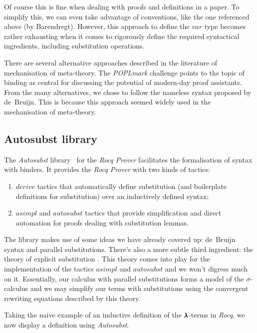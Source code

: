 Of course this is fine when dealing with proofs and definitions in a paper.
To simplify this, we can even take advantage of conventions, like the one referenced above (by Barendregt).
However, this approach to define the \lst$var$ type becomes rather exhausting when it comes to rigorously define the required syntactical ingredients, including substitution operations.

There are several alternative approaches described in the literature of mechanisation of meta-theory. 
The \textit{POPLmark} challenge \cite{POPLmark} points to the topic of binding as central for discussing the potential of modern-day proof assistants.
From the many alternatives, we chose to follow the nameless syntax proposed by de~Bruijn.
This is because this approach seemed widely used in the mechanisation of meta-theory.

\subsection{Autosubst library}


The \textit{Autosubst} library~\cite{AutosubstSchafer,AutosubstManual} for the \textit{Rocq Prover} facilitates the formalisation of syntax with binders.
It provides the \textit{Rocq Prover} with two kinds of tactics:
\begin{enumerate}
  \item \lst$derive$ tactics that automatically define substitution (and boilerplate definitions for substitution) over an inductively defined syntax;
  \item \lst$asimpl$ and \lst$autosubst$ tactics that provide simplification and direct automation for proofs dealing with substitution lemmas.
\end{enumerate}

The library makes use of some ideas we have already covered up: de~Bruijn syntax and parallel substitutions.
There's also a more subtle third ingredient: the theory of explicit substitution \cite{Abadi}.
This theory comes into play for the implementation of the tactics \lst$asimpl$ and \lst$autosubst$ and we won't digress much on it.
Essentially, our calculus with parallel substitutions forms a model of the $\sigma$-calculus and we may simplify our terms with substitutions using the convergent rewriting equations described by this theory.

Taking the naive example of an inductive definition of the $\pmb{\lambda}$-terms in \textit{Rocq}, we now display a definition using \textit{Autosubst}.

